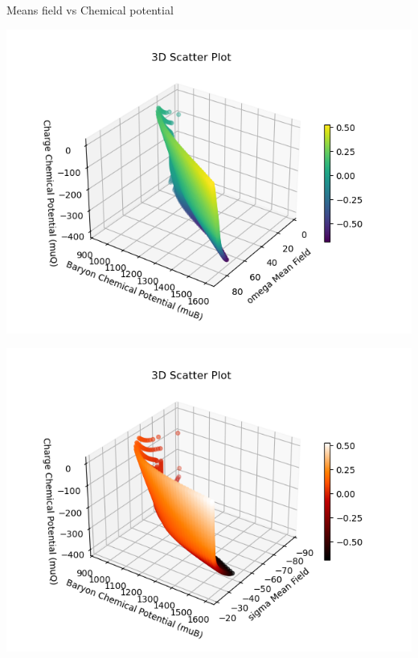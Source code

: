 \documentclass[12pt,aspectratio169]{beamer}
\begin{document}
\begin{frame}{Means field vs Chemical potential}
\begin{minipage}[t]{0.48\textwidth}
  \centering
  \includegraphics[width=0.9\linewidth]{omega_vs_chemical_potentials1.png}
\end{minipage}
\hfill
\begin{minipage}[t]{0.48\textwidth}
  \centering
  \includegraphics[width=0.9\linewidth]{omega_vs_chemical_potentials2.png}
\end{minipage}

    
\end{frame}
\end{document}
